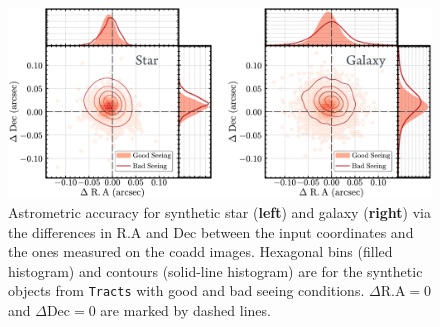 \documentclass[useamsfonts]{pasj01}
\def\tracts{\texttt{Tracts}}
\begin{document}
\begin{figure}
    \begin{center}
        \includegraphics[width=\textwidth]{fig/synpipe_astrometry}
    \end{center}
    \caption{
        Astrometric accuracy for synthetic star (\textbf{left}) and galaxy
        (\textbf{right}) via the differences in R.A and Dec between the input
        coordinates and the ones measured on the coadd images.
        Hexagonal bins (filled histogram) and contours (solid-line histogram) are for
        the synthetic objects from \tracts{} with good and bad seeing conditions.
        $\Delta\mathrm{R.A}=0$ and $\Delta\mathrm{Dec}=0$ are marked by dashed lines.
        }
    \label{fig:astrometry}
\end{figure}
\end{document}
